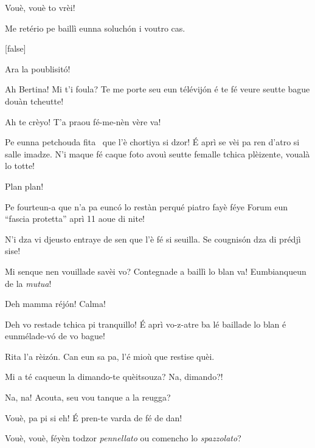 \begin{drama}
\Pascalspeaks {} Vouè, vouè to vrèi!

\DzeudzoSenliquerspeaks Me retério pe baillì eunna soluchón i voutro cas.

[false]



\Ritaspeaks {} Ara la poublisitó!


\Tobiespeaks {} Ah Bertina! Mi t'i foula? Te me porte seu eun télévij\'on é te fé veure seutte bague douàn tcheutte!

\Bertinaspeaks {} Ah te crèyo! T’a praou fé-me-nèn vère va! 

\Tobiespeaks Pe eunna petchouda fita \fitaa\ que l’è chortiya si dzor! É aprì se vèi pa ren d’atro si salle imadze. N’i maque fé caque foto avouì seutte femalle tchica plèizente, voualà lo totte!

\Pascalspeaks {} Plan plan!

\Bertinaspeaks Pe fourteun-a que n’a pa eunc\'o lo restàn perqué piatro fayè féye Forum eun ``fascia protetta'' aprì 11 aoue di nite!

\Eumprezeospeaks N’i dza vi djeusto entraye de sen que l’è fé si seuilla. Se cougnisón dza di prédjì sise!

\Tobiespeaks Mi senque nen vouillade savèi vo? Contegnade a baillì lo blan va! Eumbianqueun de la \textit{mutua}!

\Simonspeaks Deh mamma réjón! Calma!

\Ritaspeaks {} Deh vo restade tchica pi tranquillo!  É aprì vo-z-atre ba lé baillade lo blan é eunmélade-vó de vo bague!

\Simonspeaks Rita l’a rèizón. Can eun sa pa, l’é mioù que restise quèi.

\Eumprezeospeaks Mi a té caqueun la dimando-te quèitsouza? Na, dimando?!

\Simonspeaks Na, na! Acouta, seu vou tanque a la reugga?

\Eumprezeospeaks Vouè, pa pi si eh! É pren-te varda de fé de dan!

\Simonspeaks Vouè, vouè, féyèn todzor \textit{pennellato} ou comencho lo \textit{spazzolato}?


\end{drama}

